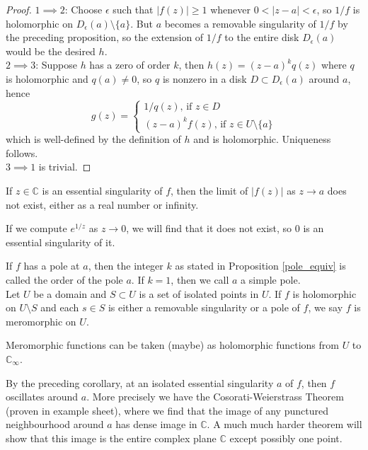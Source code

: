 \begin{proof}
    $1\implies 2$: Choose $\epsilon$ such that $|f(z)|\ge 1$ whenever $0<|z-a|<\epsilon$, so $1/f$ is holomorphic on $D_\epsilon(a)\setminus\{a\}$.
    But $a$ becomes a removable singularity of $1/f$ by the preceding proposition, so the extension of $1/f$ to the entire disk $D_\epsilon(a)$ would be the desired $h$.\\
    $2\implies 3$: Suppose $h$ has a zero of order $k$, then $h(z)=(z-a)^kq(z)$ where $q$ is holomorphic and $q(a)\neq 0$, so $q$ is nonzero in a disk $D\subset D_\epsilon(a)$ around $a$, hence
    $$g(z)=\begin{cases}
        1/q(z)\text{, if $z\in D$}\\
        (z-a)^kf(z)\text{, if $z\in U\setminus\{a\}$}
    \end{cases}$$
    which is well-defined by the definition of $h$ and is holomorphic.
    Uniqueness follows.\\
    $3\implies 1$ is trivial.
\end{proof}
\begin{corollary}
    If $z\in\mathbb C$ is an essential singularity of $f$, then the limit of $|f(z)|$ as $z\to a$ does not exist, either as a real number or infinity.
\end{corollary}
\begin{example}
    If we compute $e^{1/z}$ as $z\to 0$, we will find that it does not exist, so $0$ is an essential singularity of it.
\end{example}
\begin{definition}
    If $f$ has a pole at $a$, then the integer $k$ as stated in Proposition \ref{pole_equiv} is called the order of the pole $a$.
    If $k=1$, then we call $a$ a simple pole.\\
    Let $U$ be a domain and $S\subset U$ is a set of isolated points in $U$.
    If $f$ is holomorphic on $U\setminus S$ and each $s\in S$ is either a removable singularity or a pole of $f$, we say $f$ is meromorphic on $U$.
\end{definition}
Meromorphic functions can be taken (maybe) as holomorphic functions from $U$ to $\mathbb C_\infty$.
\begin{remark}
    By the preceding corollary, at an isolated essential singularity $a$ of $f$, then $f$ oscillates around $a$.
    More precisely we have the Cosorati-Weierstrass Theorem (proven in example sheet), where we find that the image of any punctured neighbourhood around $a$ has dense image in $\mathbb C$.
    A much much harder theorem will show that this image is the entire complex plane $\mathbb C$ except possibly one point.
\end{remark}
